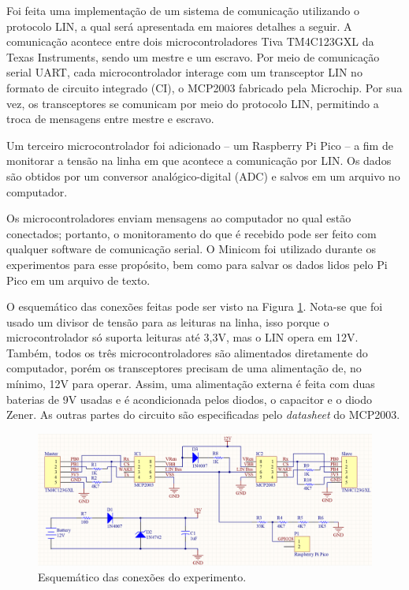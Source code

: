 

Foi feita uma implementação de um sistema de comunicação utilizando o protocolo LIN, a qual será apresentada em maiores detalhes a seguir. A comunicação acontece entre dois microcontroladores Tiva TM4C123GXL \cite{datasheet:tiva} da Texas Instruments, sendo um mestre e um escravo. Por meio de comunicação serial UART, cada microcontrolador interage com um transceptor LIN no formato de circuito integrado (CI), o MCP2003 \cite{datasheet:mcp2003} fabricado pela Microchip. Por sua vez, os transceptores se comunicam por meio do protocolo LIN, permitindo a troca de mensagens entre mestre e escravo.

Um terceiro microcontrolador foi adicionado -- um Raspberry Pi Pico \cite{datasheet:pico} -- a fim de monitorar a tensão na linha em que acontece a comunicação por LIN. Os dados são obtidos por um conversor analógico-digital (ADC) e salvos em um arquivo no computador.

Os microcontroladores enviam mensagens ao computador no qual estão conectados; portanto, o monitoramento do que é recebido pode ser feito com qualquer software de comunicação serial. O Minicom \cite{minicom} foi utilizado durante os experimentos para esse propósito, bem como para salvar os dados lidos pelo Pi Pico em um arquivo de texto.

O esquemático das conexões feitas pode ser visto na Figura \ref{fig:esquematico}. Nota-se que foi usado um divisor de tensão para as leituras na linha, isso porque o microcontrolador só suporta leituras até 3,3V, mas o LIN opera em 12V. Também, todos os três microcontroladores são alimentados diretamente do computador, porém os transceptores precisam de uma alimentação de, no mínimo, 12V para operar. Assim, uma alimentação externa é feita com duas baterias de 9V usadas e é acondicionada pelos diodos, o capacitor e o diodo Zener. As outras partes do circuito são especificadas pelo \textit{datasheet} do MCP2003.

\begin{figure}[htb]
    \centering
    \includegraphics[width=.9\textwidth]{../figs/lin-schematic}
    \caption{Esquemático das conexões do experimento.}
    \label{fig:esquematico}
\end{figure}

